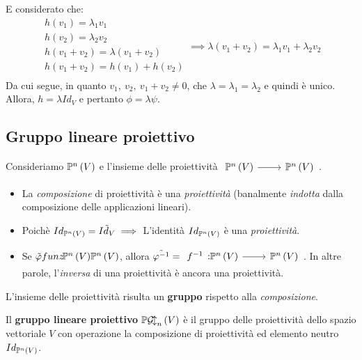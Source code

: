 \begin{demonstration}
\begin{equation*}
\end{equation*}
E considerato che:
\begin{equation*}
	\begin{array}{l}
		h\left(v_1\right)=\lambda_1 v_1\\
		h\left(v_2\right)=\lambda_2 v_2\\
		h\left(v_1+v_2\right)=\lambda\left(v_1+v_2\right)\\
		h\left(v_1+v_2\right)=h\left(v_1\right)+h\left(v_2\right)\\
	\end{array}
	\implies \lambda\left(v_1+v_2\right)=\lambda_1 v_1+\lambda_2 v_2
\end{equation*}
Da cui segue, in quanto $v_1,\ v_2,\ v_1+v_2\neq 0$, che $\lambda=\lambda_1=\lambda_2$ e quindi è unico.\\
Allora, $h=\lambda Id_{V}$ e pertanto $\phi=\lambda \psi$.
\end{demonstration}
\subsection{Gruppo lineare proiettivo}
\begin{observe}
	Consideriamo $\proj{V}$ e l'insieme delle proiettività $\funz{\ }{\proj{V}}{\proj{V}}$.
	\begin{itemize}
		\item La \textit{composizione} di proiettività è una \textit{proiettività} (banalmente \textit{indotta} dalla composizione delle applicazioni lineari).
		\item Poichè $Id_{\proj{V}}=\tilde{Id_V}\implies$ L'identità $Id_{\proj{V}}$ è una \textit{proiettività}.
		\item Se $\tilde{\phi}\\funz{\! }{\proj{V}}{\proj{V}}$, allora $\tilde{\phi^{-1}}=\funz{f^{-1}}{\proj{V}}{\proj{V}}$. In altre parole, l'\textit{inversa} di una proiettività è ancora una proiettività.
	\end{itemize}
L'insieme delle proiettività risulta un \textbf{gruppo} rispetto alla \textit{composizione}.
\end{observe}
\begin{define}
Il \textbf{gruppo lineare proiettivo} $\projgl{V}$ è il gruppo delle proiettività dello spazio vettoriale $V$ con operazione la composizione di proiettività ed elemento neutro $Id_{\proj{V}}$. 
\end{define}
